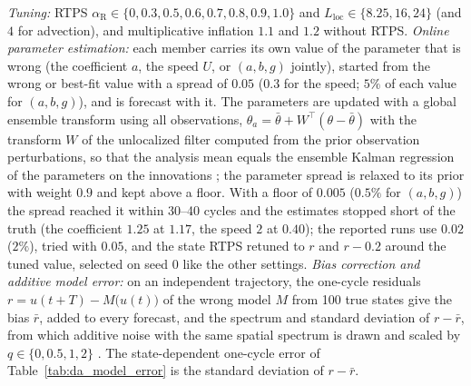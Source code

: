  \emph{Tuning:} RTPS $\alpha_{\mathrm R}\in\{0,0.3,0.5,0.6,0.7,0.8,0.9,1.0\}$ and
$L_{\mathrm{loc}}\in\{8.25,16,24\}$ (and $4$ for advection), and multiplicative inflation $1.1$ and $1.2$ without RTPS.
\emph{Online parameter estimation:} each member carries its own value of the parameter that is wrong
(the coefficient $a$, the speed $U$, or $(a,b,g)$ jointly), started from the wrong or best-fit value
with a spread of $0.05$ ($0.3$ for the speed; $5\%$ of each value for $(a,b,g)$), and is forecast with it.
The parameters are updated with a global ensemble transform using all observations,
$\theta_a=\bar\theta+W^\top(\theta-\bar\theta)$ with the transform $W$ of the unlocalized filter computed from
the prior observation perturbations, so that the analysis mean equals the ensemble Kalman regression
of the parameters on the innovations \citep{anderson2001,ruiz2013}; the parameter spread is relaxed to
its prior with weight $0.9$ and kept above a floor. With a floor of $0.005$ ($0.5\%$ for $(a,b,g)$)
the spread reached it within 30--40 cycles and the estimates stopped short of the truth (the coefficient
$1.25$ at $1.17$, the speed $2$ at $0.40$); the reported runs use $0.02$ ($2\%$), tried with $0.05$, and the
state RTPS retuned to $r$ and $r-0.2$ around the tuned value, selected on seed 0 like the other settings. \emph{Bias correction and
additive model error:} on an independent trajectory, the one-cycle residuals
$r=u(t+T)-M\big(u(t)\big)$ of the wrong model $M$ from 100 true states give the bias $\bar r$, added to
every forecast, and the spectrum and standard deviation of $r-\bar r$, from which additive noise with
the same spatial spectrum is drawn and scaled by $q\in\{0,0.5,1,2\}$ \citep{dee2005}. The state-dependent
one-cycle error of Table~\ref{tab:da_model_error} is the standard deviation of $r-\bar r$.

